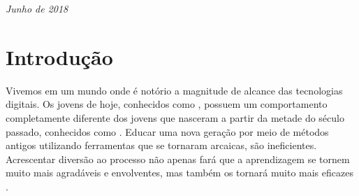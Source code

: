 \documentclass[12pt,fleqn]{book} %
\begin{document}
\noindent \textit{Junho de 2018} %




\pagestyle{empty} %

\tableofcontents %

\cleardoublepage %

\pagestyle{fancy} %





\chapter{Introdução}
Vivemos em um mundo onde é notório a magnitude de alcance das tecnologias digitais. Os jovens de hoje, conhecidos como , possuem um comportamento completamente diferente dos jovens que nasceram a partir da metade do século passado, conhecidos como . Educar uma nova geração por meio de métodos antigos utilizando ferramentas que se tornaram arcaicas, são ineficientes. Acrescentar diversão ao processo não apenas fará que a aprendizagem se tornem muito mais agradáveis e envolventes, mas também os tornará muito mais eficazes \cite{prensky2012aprendizagem}.
\end{document}
